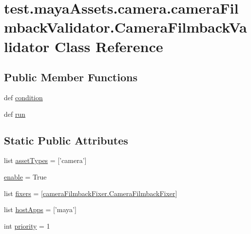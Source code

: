\hypertarget{classtest_1_1mayaAssets_1_1camera_1_1cameraFilmbackValidator_1_1CameraFilmbackValidator}{\section{test.\-maya\-Assets.\-camera.\-camera\-Filmback\-Validator.\-Camera\-Filmback\-Validator \-Class \-Reference}
\label{d3/d05/classtest_1_1mayaAssets_1_1camera_1_1cameraFilmbackValidator_1_1CameraFilmbackValidator}
}
\subsection*{\-Public \-Member \-Functions}
\begin{DoxyCompactItemize}
\item 
def \hyperlink{classtest_1_1mayaAssets_1_1camera_1_1cameraFilmbackValidator_1_1CameraFilmbackValidator_a4e6a01fcfa4d178eeb831822d49e7a70}{condition}
\item 
def \hyperlink{classtest_1_1mayaAssets_1_1camera_1_1cameraFilmbackValidator_1_1CameraFilmbackValidator_aab967f4aaf35790a027e1d4f152f4b61}{run}
\end{DoxyCompactItemize}
\subsection*{\-Static \-Public \-Attributes}
\begin{DoxyCompactItemize}
\item 
list \hyperlink{classtest_1_1mayaAssets_1_1camera_1_1cameraFilmbackValidator_1_1CameraFilmbackValidator_a676d19184f3439f56ca7b4bc0ffd95be}{asset\-Types} = \mbox{[}'camera'\mbox{]}
\item 
\hyperlink{classtest_1_1mayaAssets_1_1camera_1_1cameraFilmbackValidator_1_1CameraFilmbackValidator_af094c901b1225efba1a988c1a280ed71}{enable} = \-True
\item 
list \hyperlink{classtest_1_1mayaAssets_1_1camera_1_1cameraFilmbackValidator_1_1CameraFilmbackValidator_a01ee035c7dc376ca837f7c3eab55677e}{fixers} = \mbox{[}\hyperlink{classtest_1_1mayaAssets_1_1camera_1_1cameraFilmbackFixer_1_1CameraFilmbackFixer}{camera\-Filmback\-Fixer.\-Camera\-Filmback\-Fixer}\mbox{]}
\item 
list \hyperlink{classtest_1_1mayaAssets_1_1camera_1_1cameraFilmbackValidator_1_1CameraFilmbackValidator_adc993ed5e2f0a88dd33023c0f8c7f62e}{host\-Apps} = \mbox{[}'maya'\mbox{]}
\item 
int \hyperlink{classtest_1_1mayaAssets_1_1camera_1_1cameraFilmbackValidator_1_1CameraFilmbackValidator_abd75e42d3d8250430cc57542ce864482}{priority} = 1
\end{DoxyCompactItemize}


